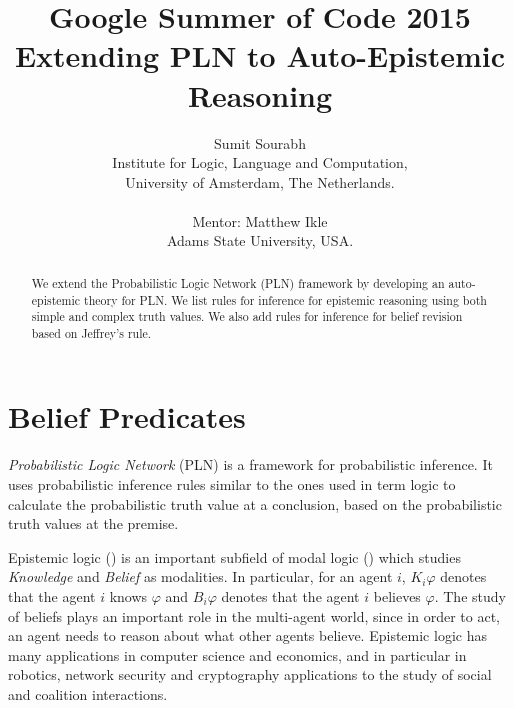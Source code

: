 \documentclass[12pt]{article}
\title{{\small \bf Google Summer of Code 2015}\\Extending PLN to Auto-Epistemic Reasoning }
\author{Sumit Sourabh \\ \small{Institute for Logic, Language and Computation}, \\ {\small University of Amsterdam, The Netherlands.} \\\\ Mentor: Matthew Ikle \\ \small{Adams State University, USA.} }
\date{}
\begin{document}
\maketitle
\begin{abstract}
We extend the Probabilistic Logic Network (PLN) framework by developing an auto-epistemic theory for PLN. We list rules for inference for epistemic reasoning using both simple and complex truth values. We also add rules for inference for belief revision based on Jeffrey's rule. 
\end{abstract}

\section{Belief Predicates}

{\em  Probabilistic Logic Network} (PLN) \cite{PLN} is a framework for probabilistic inference. It uses probabilistic inference rules similar to the ones used in term logic to calculate the probabilistic truth value at a conclusion, based on the probabilistic truth values at the premise. 




Epistemic logic (\cite{Hoekverbrugge,Kooi07}) is an important subfield of modal logic (\cite{BRV,CZ97}) which studies \emph{Knowledge} and \emph{Belief} as  modalities. In particular, for an agent $i$, $K_i\varphi$ denotes that the agent $i$ knows $\varphi$ and $B_i \varphi$ denotes that the agent $i$ believes $\varphi$. The study of beliefs plays an important role in the multi-agent world, since in order to act, an agent  needs to reason about what other agents believe. Epistemic logic has many applications \cite{Meyer} in computer science and economics, and in particular in robotics, network security and cryptography applications to the study of social and coalition interactions. %
\end{document}
